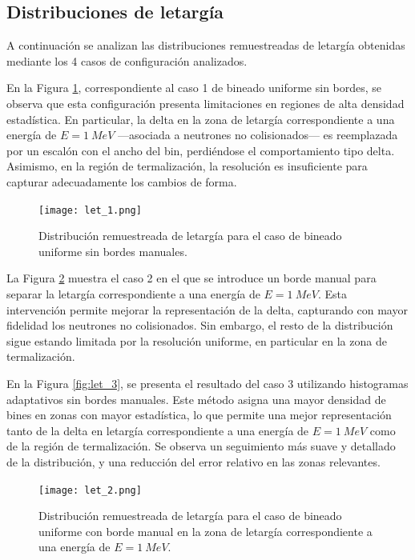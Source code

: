 \subsection{Distribuciones de letargía}
A continuación se analizan las distribuciones remuestreadas de letargía obtenidas mediante los 4 casos de configuración analizados.

En la Figura \ref{fig:let_1}, correspondiente al caso 1 de bineado uniforme sin bordes, se observa que esta configuración presenta limitaciones en regiones de alta densidad estadística. En particular, la delta en la zona de letargía correspondiente a una energía de $E = 1~MeV$ —asociada a neutrones no colisionados— es reemplazada por un escalón con el ancho del bin, perdiéndose el comportamiento tipo delta. Asimismo, en la región de termalización, la resolución es insuficiente para capturar adecuadamente los cambios de forma.

\begin{figure}[H]
    \centering
    \texttt{[image: let\_1.png]}
    \caption{Distribución remuestreada de letargía para el caso de bineado uniforme sin bordes manuales.}
    \label{fig:let_1}
\end{figure}

La Figura \ref{fig:let_2} muestra el caso 2 en el que se introduce un borde manual para separar la letargía correspondiente a una energía de $E = 1~MeV$. Esta intervención permite mejorar la representación de la delta, capturando con mayor fidelidad los neutrones no colisionados. Sin embargo, el resto de la distribución sigue estando limitada por la resolución uniforme, en particular en la zona de termalización.

En la Figura \ref{fig:let_3}, se presenta el resultado del caso 3 utilizando histogramas adaptativos sin bordes manuales. Este método asigna una mayor densidad de bines en zonas con mayor estadística, lo que permite una mejor representación tanto de la delta en letargía correspondiente a una energía de $E = 1~MeV$ como de la región de termalización. Se observa un seguimiento más suave y detallado de la distribución, y una reducción del error relativo en las zonas relevantes.

\begin{figure}[H]
    \centering
    \texttt{[image: let\_2.png]}
    \caption{Distribución remuestreada de letargía para el caso de bineado uniforme con borde manual en la zona de letargía correspondiente a una energía de $E = 1~MeV$.}
    \label{fig:let_2}
\end{figure}

